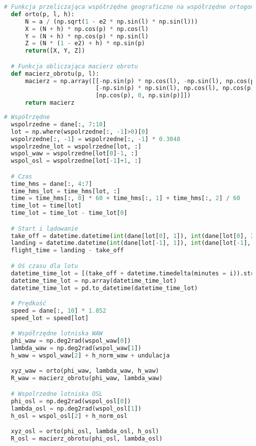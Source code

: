 \documentclass[fleqn,10pt,a4paper]{article}
\begin{document}
\begin{lstlisting}[language=Python, caption=Funkcje transformacji współrzędnych, label = transformacja]
  # Funkcja przeliczająca współrzędne geograficzne na współrzędne ortogonalne
  def orto(p, l, h):
      N = a / (np.sqrt(1 - e2 * np.sin(l) * np.sin(l)))
      X = (N + h) * np.cos(p) * np.cos(l)
      Y = (N + h) * np.cos(p) * np.sin(l)
      Z = (N * (1 - e2) + h) * np.sin(p)
      return([X, Y, Z])

  # Funkcja obliczająca macierz obrotu
  def macierz_obrotu(p, l):
      macierz = np.array([[-np.sin(p) * np.cos(l), -np.sin(l), np.cos(p) * np.cos(l)],
                          [-np.sin(p) * np.sin(l), np.cos(l), np.cos(p) * np.sin(l)],
                          [np.cos(p), 0, np.sin(p)]])
      return macierz

\end{lstlisting}
\newpage
\begin{lstlisting}[language=Python, caption=Selekcja danych, label = dane]
  # Współrzędne
  wspolrzedne = dane[:, 7:10]
  lot = np.where(wspolrzedne[:, -1]>0)[0]
  wspolrzedne[:, -1] = wspolrzedne[:, -1] * 0.3048
  wspolrzedne_lot = wspolrzedne[lot, :]
  wspol_waw = wspolrzedne[lot[0]-1, :]
  wspol_osl = wspolrzedne[lot[-1]+1, :]

  # Czas
  time_hms = dane[:, 4:7]
  time_hms_lot = time_hms[lot, :]
  time = time_hms[:, 0] * 60 + time_hms[:, 1] + time_hms[:, 2] / 60
  time_lot = time[lot]
  time_lot = time_lot - time_lot[0]

  # Start i lądowanie
  take_off = datetime.datetime(int(dane[lot[0], 1]), int(dane[lot[0], 2]), int(dane[lot[0], 3]), int(dane[lot[0], 4]), int(dane[lot[0], 5]), int(dane[lot[0], 6]))
  landing = datetime.datetime(int(dane[lot[-1], 1]), int(dane[lot[-1], 2]), int(dane[lot[-1], 3]), int(dane[lot[-1], 4]), int(dane[lot[-1], 5]), int(dane[lot[-1], 6]))
  flight_time = landing - take_off

  # Oś czasu dla lotu
  datetime_time_lot = [(take_off + datetime.timedelta(minutes = i)).strftime('%H:%M') for i in time_lot]
  datetime_time_lot = np.array(datetime_time_lot)
  datetime_time_lot = pd.to_datetime(datetime_time_lot)

  # Prędkość
  speed = dane[:, 10] * 1.852
  speed_lot = speed[lot]

  # Współrzędne lotniska WAW
  phi_waw = np.deg2rad(wspol_waw[0])
  lambda_waw = np.deg2rad(wspol_waw[1])
  h_waw = wspol_waw[2] + h_norm_waw + undulacja

  xyz_waw = orto(phi_waw, lambda_waw, h_waw)
  R_waw = macierz_obrotu(phi_waw, lambda_waw)

  # Wspolrzedne lotniska OSL
  phi_osl = np.deg2rad(wspol_osl[0])
  lambda_osl = np.deg2rad(wspol_osl[1])
  h_osl = wspol_osl[2] + h_norm_osl

  xyz_osl = orto(phi_osl, lambda_osl, h_osl)
  R_osl = macierz_obrotu(phi_osl, lambda_osl)
\end{lstlisting}
\end{document}
